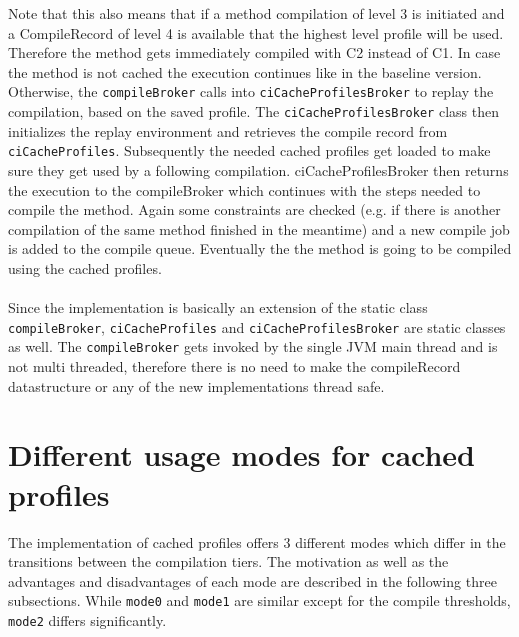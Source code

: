 Note that this also means that if a method compilation of level 3 is initiated and a CompileRecord of level 4 is available that the highest level profile will be used. Therefore the method gets immediately compiled with C2 instead of C1.
In case the method is not cached the execution continues like in the baseline version.
Otherwise, the \texttt{compileBroker} calls into \texttt{ciCacheProfilesBroker} to replay the compilation, based on the saved profile.
The \texttt{ciCacheProfilesBroker} class then initializes the replay environment and retrieves the compile record from \texttt{ciCacheProfiles}. Subsequently the needed cached profiles get loaded to make sure they get used by a following compilation. ciCacheProfilesBroker then returns the execution to the compileBroker which continues with the steps needed to compile the method. Again some constraints are checked (e.g. if there is another compilation of the same method finished in the meantime) and a new compile job is added to the compile queue. Eventually the the method is going to be compiled using the cached profiles.
\\\\
Since the implementation is basically an extension of the static class \texttt{compileBroker}, \texttt{ciCacheProfiles} and \texttt{ciCacheProfilesBroker} are static classes as well. The \texttt{compileBroker} gets invoked by the single JVM main thread and is not multi threaded, therefore there is no need to make the compileRecord datastructure or any of the new implementations thread safe. 

\section{Different usage modes for cached profiles}
The implementation of cached profiles offers 3 different modes which differ in the transitions between the compilation tiers.
The motivation as well as the advantages and disadvantages of each mode are described in the following three subsections.
While \texttt{mode0} and \texttt{mode1} are similar except for the compile thresholds, \texttt{mode2} differs significantly.

\label{s:cacheprofilesmode}
